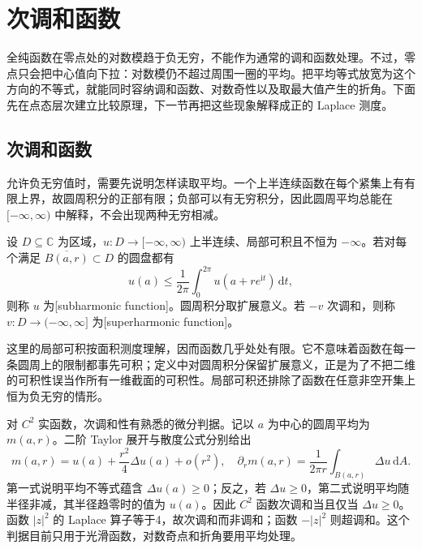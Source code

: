 \section{次调和函数}
\label{b3:sec:1503}

全纯函数在零点处的对数模趋于负无穷，不能作为通常的调和函数处理。不过，零点只会把中心值向下拉：对数模仍不超过周围一圈的平均。把平均等式放宽为这个方向的不等式，就能同时容纳调和函数、对数奇性以及取最大值产生的折角。下面先在点态层次建立比较原理，下一节再把这些现象解释成正的 Laplace 测度。

\subsection{次调和函数}
\label{b3:subsec:150301}

允许负无穷值时，需要先说明怎样读取平均。一个上半连续函数在每个紧集上有有限上界，故圆周积分的正部有限；负部可以有无穷积分，因此圆周平均总能在 \([-\infty,\infty)\) 中解释，不会出现两种无穷相减。
\begin{definition}\label{b3:def:15-subharmonic}
设 \(D\subseteq\mathbb C\) 为区域，\(u:D\to[-\infty,\infty)\) 上半连续、局部可积且不恒为 \(-\infty\)。若对每个满足 \(\overline{B(a,r)}\subset D\) 的圆盘都有
\[
 u(a)\le\frac1{2\pi}\int_0^{2\pi}u(a+re^{\mathrm{i}t})\,\mathrm{d}t,
\]
则称 \(u\) 为[subharmonic function]。圆周积分取扩展意义。若 \(-v\) 次调和，则称 \(v:D\to(-\infty,\infty]\) 为[superharmonic function]。
\end{definition}
这里的局部可积按面积测度理解，因而函数几乎处处有限。它不意味着函数在每一条圆周上的限制都事先可积；定义中对圆周积分保留扩展意义，正是为了不把二维的可积性误当作所有一维截面的可积性。局部可积还排除了函数在任意非空开集上恒为负无穷的情形。

\ProseParagraphBreak

对 \(C^2\) 实函数，次调和性有熟悉的微分判据。记以 \(a\) 为中心的圆周平均为 \(m(a,r)\)。二阶 Taylor 展开与散度公式分别给出
\[
 m(a,r)=u(a)+\frac{r^2}{4}\Delta u(a)+o(r^2),
 \quad
 \partial_r m(a,r)=\frac1{2\pi r}\int_{B(a,r)}\Delta u\,\mathrm{d}A.
\]
第一式说明平均不等式蕴含 \(\Delta u(a)\ge0\)；反之，若 \(\Delta u\ge0\)，第二式说明平均随半径非减，其半径趋零时的值为 \(u(a)\)。因此 \(C^2\) 函数次调和当且仅当 \(\Delta u\ge0\)。函数 \(|z|^2\) 的 Laplace 算子等于4，故次调和而非调和；函数 \(-|z|^2\) 则超调和。这个判据目前只用于光滑函数，对数奇点和折角要用平均处理。

